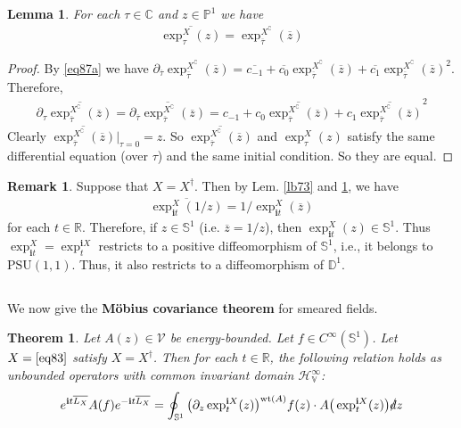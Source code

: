 \documentclass[12pt,b5paper,notitlepage]{article}
\theoremstyle{definition}
\newtheorem{rem}[df]{Remark}
\theoremstyle{plain}
\newtheorem{thm}[df]{Theorem}
\newtheorem{lm}[df]{Lemma}
\newcommand{\mc}{\mathcal}
\newcommand{\ovl}{\overline}
\newcommand{\PSU}{\mathrm{PSU}(1,1)}
\newcommand{\im}{\mathbf{i}}
\newcommand{\Co}{\complement}
\newcommand{\Cbb}{\mathbb C}
\newcommand{\Pbb}{\mathbb P}
\newcommand{\Rbb}{\mathbb R}
\newcommand{\Dbb}{\mathbb D}
\newcommand{\wt}{\mathrm{wt}}
\newcommand{\Sbb}{{\mathbb S}}
\newcommand{\HV}{\mathcal H_{\mathbb V}}
\newcommand{\ointn}{\oint\nolimits}
\newcommand{\sd}{\slashed{d}}
\numberwithin{equation}{section}
\begin{document}
\begin{lm}\label{lbb5}
For each $\tau\in\Cbb$ and $z\in\Pbb^1$ we have
\begin{align}
\ovl{\exp^X_\tau(z)}=\exp^{X^\Co}_{\ovl\tau}(\ovl z)
\end{align}
\end{lm}
\begin{proof}
By \eqref{eq87a} we have $\partial_{\ovl\tau}\exp^{X^\Co}_{\ovl\tau}(\ovl z)=\ovl{c_{-1}}+\ovl{c_0}\exp^{X^\Co}_{\ovl\tau}(\ovl z)+\ovl{c_1}\exp^{X^\Co}_{\ovl\tau}(\ovl z)^2$. Therefore, 
\begin{align*}
\partial_\tau \ovl{\exp^{X^\Co}_{\ovl\tau}(\ovl z)}=\ovl{\partial_{\ovl\tau}\exp^{X^\Co}_{\ovl\tau}(\ovl z)}=c_{-1}+c_0\ovl{\exp^{X^\Co}_{\ovl\tau}(\ovl z)}+c_1\ovl{\exp^{X^\Co}_{\ovl\tau}(\ovl z)}^2
\end{align*}
Clearly $\ovl{\exp^{X^\Co}_{\ovl\tau}(\ovl z)}\Big|_{\tau=0}=z$. So $\ovl{\exp^{X^\Co}_{\ovl\tau}(\ovl z)}$ and $\exp^X_\tau(z)$ satisfy the same differential equation (over $\tau$) and the same initial condition. So they are equal.
\end{proof}


\begin{rem}\label{lb74}
Suppose that $X=X^\dagger$. Then by Lem. \ref{lb73} and \ref{lbb5}, we have
\begin{align*}
\ovl{\exp^X_{\im t}(1/z)}=1/\exp^X_{\im t}(\ovl z)
\end{align*}
for each $t\in\Rbb$. Therefore, if $z\in\Sbb^1$ (i.e. $\ovl z=1/z$), then $\exp_{\im t}^X(z)\in\Sbb^1$. Thus $\exp_{\im t}^X=\exp^{\im X}_t$ restricts to a positive diffeomorphism of $\Sbb^1$, i.e., it belongs to $\PSU$. Thus, it also restricts to a diffeomorphism of $\Dbb^1$.
\end{rem}



\subsection{}

We now give the \textbf{M\"obius covariance theorem} for smeared fields.

\begin{thm}\label{lb65}
Let $A(z)\in\mc V$ be energy-bounded. Let $f\in C^\infty(\Sbb^1)$. Let $X=\eqref{eq83}$ satisfy $X=X^\dagger$. Then for each $t\in\Rbb$, the following relation holds as unbounded operators with common invariant domain $\HV^\infty$:
\begin{align}\label{eq86}
e^{\im t\ovl{L_X}} A(f)e^{-\im t\ovl{L_X}}=\ointn_{\Sbb^1} \big(\partial_z\exp^{\im X}_t(z)\big)^{\wt(A)}f(z)\cdot A\big(\exp^{\im X}_t(z)\big)\sd z
\end{align}
\end{thm}
\end{document}
